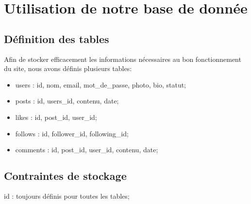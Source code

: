 \documentclass[12pt,a4paper]{article}
\begin{document}
\section{Utilisation de notre base de donnée}
\subsection{Définition des tables}
  Afin de stocker efficacement les informations nécessaires au bon fonctionnement du site, nous avons définis plusieurs tables:
  
 \begin{itemize}
 \item users : id, nom, email, mot\_de\_passe, photo, bio, statut;
 \item posts : id, users\_id, contenu, date;
 \item likes : id, post\_id, user\_id;
 \item follows : id, follower\_id, following\_id;
 \item comments : id, post\_id, user\_id, contenu, date;
 \end{itemize}

\newpage

\subsection{Contraintes de stockage}

id : toujours définis pour toutes les tables;
\end{document}
